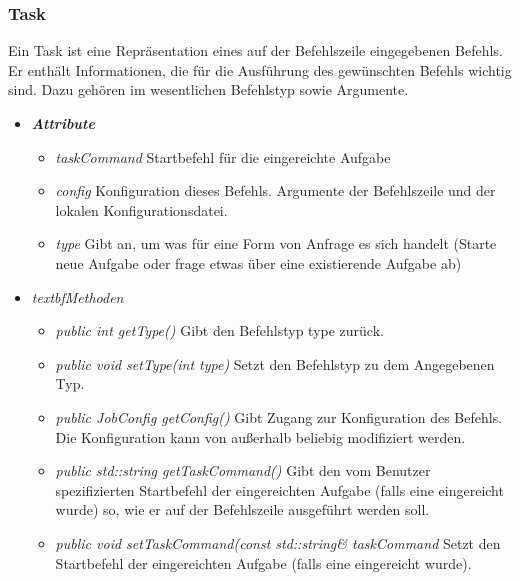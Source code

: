 \documentclass[a4paper,12pt]{article}
\begin{document}
\clearpage

\subsubsection{Task}

Ein Task ist eine Repräsentation eines auf der Befehlszeile eingegebenen Befehls. Er enthält Informationen, die für die Ausführung des gewünschten Befehls wichtig sind. Dazu gehören im wesentlichen Befehlstyp sowie Argumente.

\begin{itemize}[label={}]

	\item \textit{\textbf{Attribute}}
		\begin{itemize}[label={\textbullet}]
			\item \textit{taskCommand} Startbefehl für die eingereichte Aufgabe
			\item \textit{config} Konfiguration dieses Befehls. Argumente der Befehlszeile und der lokalen Konfigurationsdatei.
			\item \textit{type} Gibt an, um was für eine Form von Anfrage es sich handelt (Starte neue Aufgabe oder frage etwas über eine existierende Aufgabe ab)
		\end{itemize}
		
	\item \textit{textbf{Methoden}}
		\begin{itemize}[label={\textbullet}]
		
			\item \textit{public int getType()} Gibt den Befehlstyp type zurück.
		
			\item \textit{public void setType(int type)} Setzt den Befehlstyp zu dem Angegebenen Typ. 
		
			\item \textit{public JobConfig getConfig()} Gibt Zugang zur Konfiguration des Befehls. Die Konfiguration kann von außerhalb beliebig modifiziert werden. 
		
			\item \textit{public std::string getTaskCommand()} Gibt den vom Benutzer spezifizierten Startbefehl der eingereichten Aufgabe (falls eine eingereicht wurde) so, wie er auf der Befehlszeile ausgeführt werden soll.
		
			\item \textit{public void setTaskCommand(const std::string\& taskCommand} Setzt den Startbefehl der eingereichten Aufgabe (falls eine eingereicht wurde).
		\end{itemize}

\end{itemize}


\printnoidxglossaries
\end{document}
